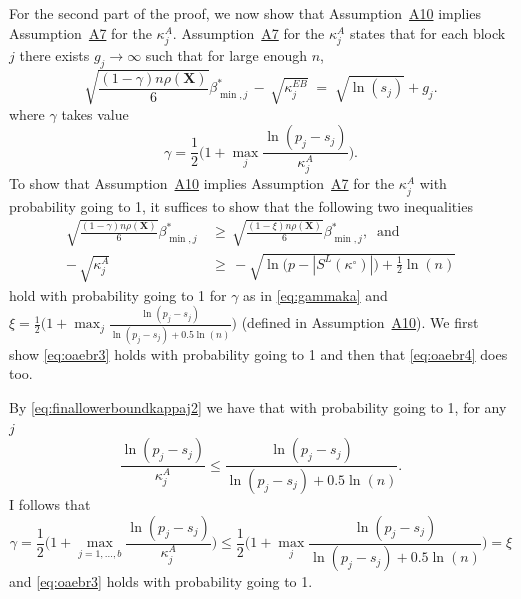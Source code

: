 \documentclass[bj,authoryear]{imsart}
\theoremstyle{plain}
\newcommand{\bs}{\boldsymbol}
\begin{document}
For the second part of the proof,
we now show that Assumption~\hyperlink{lab:A10}{A10} implies Assumption~\hyperlink{lab:A7}{A7} for the $\kappa^{A}_j$. Assumption~\hyperlink{lab:A7}{A7} for the $\kappa_j^{A}$ states that for each block $j$ there exists $g_j\to \infty$ such that for large enough $n$,
    \begin{equation*}
        \sqrt{\frac{(1-\gamma) n\rho(\bs X)}{6}}{{\beta_{\min,j}^*}} \,- \,\sqrt{\kappa^{EB}_j} \;=\; \sqrt{\ln(s_j)} + g_j .
    \end{equation*}
where $\gamma$ takes value
\begin{equation}\label{eq:gammaka}
    \gamma=\frac12\Big(1+\max_j\frac{\ln(p_j-s_j)}{\kappa^{A}_j}\Big).
\end{equation}
To show that Assumption~\hyperlink{lab:A10}{A10} implies Assumption~\hyperlink{lab:A7}{A7} for the $\kappa_j^{A}$ with probability going to 1, it suffices to show that the following two inequalities
\begin{align}
    \sqrt{\frac{ (1-\gamma)n\rho(\bs X)}{6}}{\beta_{\min,j}^*} \,&\geq \,  \sqrt{\frac{ (1-\xi)n\rho(\bs X)}{6}}{\beta_{\min,j}^*}, \label{eq:oaebr3}\;\;\text{and} \\
    - \,\sqrt{\kappa^{A}_j} \,&\geq \,-\sqrt{\ln\bigg(p-|S^{L}(\kappa^{\circ})|\bigg)+\frac12\ln(n)}\label{eq:oaebr4}
\end{align}
hold with probability going to 1 for $\gamma$ as in \eqref{eq:gammaka} and $\xi=\frac12\big(1+\max_j \frac{\ln(p_j-s_j)}{\ln(p_j-s_j)+0.5\ln(n)}\big)$ (defined in Assumption~\hyperlink{lab:A10}{A10}). We first show \eqref{eq:oaebr3} holds with probability going to 1 and then that \eqref{eq:oaebr4} does too.

By \eqref{eq:finallowerboundkappaj2} we have that with probability going to 1, for any $j$
\begin{equation*}
\frac{\ln(p_j-s_j)}{\kappa^{A}_j} 
    \leq  \frac{\ln(p_j-s_j)}{\ln(p_j-s_j)+0.5\ln(n)}.
\end{equation*}
I follows that
\begin{equation*}
    \gamma=\frac12\Big(1+\max_{j=1, \ldots,b}\frac{\ln(p_j-s_j)}{\kappa^ A_j}\Big) \leq \frac12\big(1+\max_j \frac{\ln(p_j-s_j)}{\ln(p_j-s_j)+0.5\ln(n)}\big)=\xi
\end{equation*}
and \eqref{eq:oaebr3} holds with probability going to 1.
\end{document}

